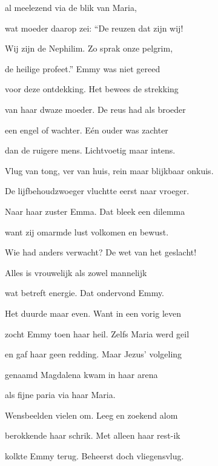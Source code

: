al meelezend via
de blik van Maria,

wat moeder daarop zei:
“De reuzen dat zijn wij!

Wij zijn de Nephilim.
Zo sprak onze pelgrim,

de heilige profeet.”
Emmy was niet gereed

voor deze ontdekking.
Het bewees de strekking

van haar dwaze moeder.
De reus had als broeder

een engel of wachter.
Eén ouder was zachter

dan de ruigere mens.
Lichtvoetig maar intens.

Vlug van tong, ver van huis,
rein maar blijkbaar onkuis.

De lijfbehoudzwoeger
vluchtte eerst naar vroeger.

Naar haar zuster Emma.
Dat bleek een dilemma

want zij omarmde lust
volkomen en bewust.

Wie had anders verwacht?
De wet van het geslacht!

Alles is vrouwelijk
als zowel mannelijk

wat betreft energie.
Dat ondervond Emmy.

Het duurde maar even.
Want in een vorig leven

zocht Emmy toen haar heil.
Zelfs Maria werd geil

en gaf haar geen redding.
Maar Jezus’ volgeling

genaamd Magdalena
kwam in haar arena

als fijne paria
via haar Maria.

Wensbeelden vielen om.
Leeg en zoekend alom

berokkende haar schrik.
Met alleen haar rest-ik

kolkte Emmy terug.
Beheerst doch vliegensvlug.
